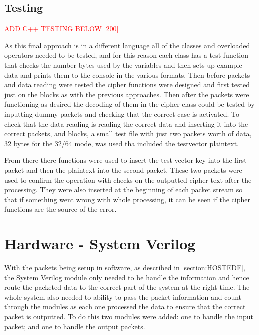 \documentclass[12pt,twoside,a4paper]{report}
\begin{document}
    \subsection{Testing}
	\textcolor{red}{ADD C++ TESTING BELOW [200]} 
	
	As this final approach is in a different language all of the classes and overloaded operators needed to be tested, and for this reason each class has a test function that checks the number bytes used by the variables and then sets up example data and prints them to the console in the various formats. Then before packets and data reading were tested the cipher functions were designed and first tested just on the blocks as with the previous approaches. Then after the packets were functioning as desired the decoding of them in the cipher class could be tested by inputting dummy packets and checking that the correct case is activated. To check that the data reading is reading the correct data and inserting it into the correct packets, and blocks, a small test file with just two packets worth of data, 32 bytes for the 32/64 mode, was used tha included the testvector plaintext.
	
	From there there functions were used to insert the test vector key into the first packet and then the plaintext into the second packet. These two packets were used to confirm the operation with checks on the outputted cipher text after the processing. They were also inserted at the beginning of each packet stream so that if something went wrong with whole processing, it can be seen if the cipher functions are the source of the error.
    
	\section{Hardware - System Verilog}
	\label{section:SVF}
		
	With the packets being setup in software, as described in \autoref{section:HOSTEDF}, the System Verilog module only needed to be handle the information and hence route the packeted data to the correct part of the system at the right time. The whole system also needed to ability to pass the packet information and count through the modules as each one processed the data to ensure that the correct packet is outputted. To do this two modules were added: one to handle the input packet; and one to handle the output packets.
	
\end{document}
